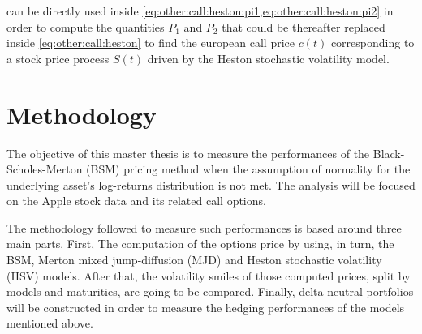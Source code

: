 \documentclass[12pt,a4paper]{report}
\begin{document}
 can be directly used inside \cref{eq:other:call:heston:pi1,eq:other:call:heston:pi2} in order to compute the quantities $P_1$ and $P_2$ that could be thereafter replaced inside \cref{eq:other:call:heston} to find the european call price  $c(t)$ corresponding to a stock price process $S(t)$ driven by the Heston stochastic volatility model.

























%
%
\chapter{Methodology}
\label{cha:Methodology}

% 

The objective of this master thesis is to measure the performances of the Black-Scholes-Merton (BSM) pricing method when the assumption of normality for the underlying asset's log-returns distribution is not met.
The analysis will be focused on the Apple stock data and its related call options.

The methodology followed to measure such performances is based around three main parts. 
First, The computation of the options price by using, in turn, the BSM, Merton mixed jump-diffusion (MJD) and Heston stochastic volatility (HSV) models. 
After that, the volatility smiles of those computed prices, split by models and maturities, are going to be compared.
Finally, delta-neutral portfolios will be constructed in order to measure the hedging performances of the models mentioned above.
\end{document}
